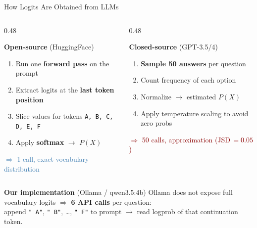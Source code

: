 \documentclass{beamer}
\begin{document}
\begin{frame}{How Logits Are Obtained from LLMs}

\begin{columns}[T]
  \begin{column}{0.48\textwidth}
    \begin{block}{\textbf{Open-source} (HuggingFace)}
    \small
    \begin{enumerate}\setlength\itemsep{3pt}
      \item Run one \textbf{forward pass} on the prompt
      \item Extract logits at the \textbf{last token position}
      \item Slice values for tokens \texttt{A, B, C, D, E, F}
      \item Apply \textbf{softmax} $\to$ $P(X)$
    \end{enumerate}
    \textcolor{steelblue}{\small $\Rightarrow$ 1 call, exact vocabulary distribution}
    \end{block}
  \end{column}
  \begin{column}{0.48\textwidth}
    \begin{block}{\textbf{Closed-source} (GPT-3.5/4)}
    \small
    \begin{enumerate}\setlength\itemsep{3pt}
      \item \textbf{Sample 50 answers} per question
      \item Count frequency of each option
      \item Normalize $\to$ estimated $P(X)$
      \item Apply temperature scaling to avoid zero probs
    \end{enumerate}
    \textcolor{darkred}{\small $\Rightarrow$ 50 calls, approximation (JSD\,$=0.05$)}
    \end{block}
  \end{column}
\end{columns}

\medskip

\begin{block}{\textbf{Our implementation} (Ollama / qwen3.5:4b)}
\small
Ollama does not expose full vocabulary logits $\Rightarrow$ \textbf{6 API calls} per question:\\
append \texttt{" A"}, \texttt{" B"}, \ldots, \texttt{" F"} to prompt $\to$ read logprob of that continuation token.
\end{block}

\end{frame}
\end{document}
